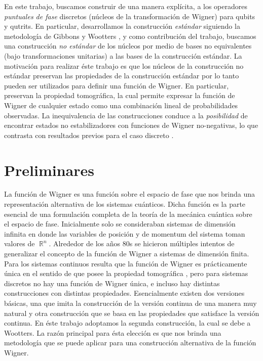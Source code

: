\documentclass[a4paper]{report}
\DeclareMathOperator{\R}{\mathbb{R}}
\begin{document}
  En este trabajo, buscamos construir de una manera
  explícita, a los operadores \textit{puntuales de fase}
  discretos (núcleos de la transformación de Wigner) para
  qubits y qutrits. En particular, desarrollamos la
  construcción \textit{estándar} siguiendo la metodología de
  Gibbons y Wootters \cite{wootters1987}, y como
  contribución del trabajo, buscamos una construcción
  \textit{no estándar} de los núcleos por medio de bases no
  equivalentes (bajo transformaciones unitarias) a las bases
  de la construcción estándar. La motivación para realizar
  éste trabajo es que los núcleos de la construcción no
  estándar preservan las propiedades de la construcción
  estándar por lo tanto pueden ser utilizados para definir
  una función de Wigner. En particular, preservan la
  propiedad tomográfica, la cual permite expresar la función
  de Wigner de cualquier estado como una combinación lineal
  de probabilidades observadas. La inequivalencia de las
  construcciones conduce a la \textit{posibilidad} de
  encontrar estados no estabilizadores con funciones de
  Wigner no-negativas, lo que contrasta con resultados
  previos para el caso discreto \cite{gross2006, galvao2005,
  cormick2006a}.

  \chapter{Preliminares}

  La función de Wigner es una función sobre el espacio de
  fase que nos brinda una representación alternativa de los
  sistemas cuánticos. Dicha función es la parte esencial de
  una formulación completa de la teoría de la mecánica
  cuántica sobre el espacio de fase. Inicialmente solo se
  consideraban sistemas de dimensión infinita en donde las
  variables de posición y de momentum del sistema toman
  valores de $\R^{n}$. Alrededor de los años 80s se hicieron
  múltiples intentos de generalizar el concepto de la
  función de Wigner a sistemas de dimensión finita. Para los
  sistemas continuos resulta que la función de Wigner es
  prácticamente única en el sentido de que posee la
  propiedad tomográfica \cite{ellinas2008}, pero para
  sistemas discretos no hay una función de Wigner única, e
  incluso hay distintas construcciones con distintas
  propiedades.  Esencialmente existen dos versiones básicas,
  una que imita la construcción de la versión continua de
  una manera muy natural y otra construcción que se basa en
  las propiedades que satisface la versión continua. En éste
  trabajo adoptamos la segunda construcción, la cual se debe
  a Wootters. La razón principal para ésta elección es que
  nos brinda una metodología que se puede aplicar para una
  construcción alternativa de la función Wigner.
\end{document}
